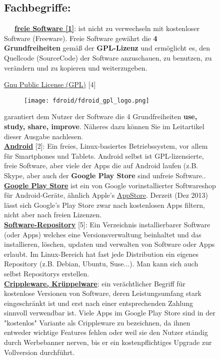 \documentclass[10pt,a4paper,ngerman,twoside]{article} %
\begin{document}
\begin{figure}
\subsection*{Fachbegriffe:}

~~~\href{http://de.wikipedia.org/wiki/Freie_Software}{\textbf{freie Software [1]}}: ist nicht zu verwechseln mit kostenloser Software (Freeware). Freie Software gewährt die \textbf{4 Grundfreiheiten} gemäß der \textbf{GPL-Lizenz} und ermöglicht es, den Quellcode (SourceCode) der Software anzuschauen, zu benutzen, zu verändern und zu kopieren und weiterzugeben.

\href{http://de.wikipedia.org/wiki/GNU_General_Public_License}{Gnu Public License (GPL)} [4]
\begin{figure}
\texttt{[image: fdroid/fdroid\_gpl\_logo.png]}
\end{figure}
garantiert dem Nutzer der Software die 4 Grundfreiheiten \textbf{use, study, share, improve}. Näheres dazu können Sie im Leitartikel dieser Ausgabe nachlesen. \\

\href{http://www.android.com/}{\textbf{Android}} [2]: Ein freies, Linux-basiertes Betriebssystem, vor allem für Smartphones und Tablets. Android selbst ist GPL-lizensierte, freie Software, aber viele der Apps die auf Android laufen (z.B. Skype, aber auch der \textbf{Google Play Store} sind unfreie Software.. \\

\href{http://de.wikipedia.org/wiki/Google_Play}{\textbf{Google Play Store}} ist ein von Google vorinstallierter Softwareshop für Android-Geräte, ähnlich Apple's \href{http://de.wikipedia.org/wiki/AppStore}{AppStore}. Derzeit (Dez 2013) lässt sich Google's Play Store zwar nach kostenlosen Apps filtern, nicht aber nach freien Lizenzen. \\

\href{http://de.wikipedia.org/wiki/Repository}{\textbf{Software-Repository}} [5]: Ein Verzeichnis installierbarer Software (oder Apps) welches eine Versionsverwaltung beinhaltet und das installieren, löschen, updaten und verwalten von Software oder Apps erlaubt. Im Linux-Bereich hat fast jede Distribution ein eigenes Repository (z.B. Debian, Ubuntu, Suse...). Man kann sich auch selbst Repositorys erstellen. \\

\href{http://de.wikipedia.org/wiki/Crippleware}{\textbf{Crippleware, Krüppelware}}: ein verächtlicher Begriff für kostenlose Versionen von Software, deren Leistungsumfang stark eingeschränkt ist und erst nach einer entsprechenden Zahlung sinnvoll verwendbar ist. Viele Apps im Google Play Store sind in der "kostenlos" Variante als Crippleware zu bezeichnen, da ihnen entweder wichtige Features fehlen oder weil sie den Nutzer ständig durch Werbebanner nerven, bis er ein kostenpflichtiges Upgrade zur Vollversion durchführt.


\end{figure}
\end{document}
